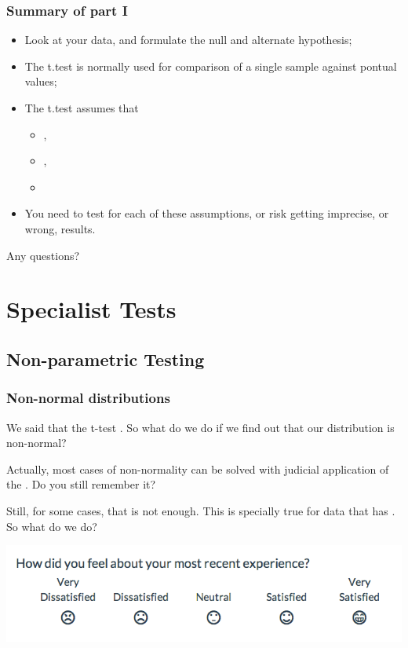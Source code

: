 \documentclass[10pt]{beamer}
\begin{document}
\begin{frame}
  \frametitle{Summary of part I}
  \begin{itemize}
  \item Look at your data, and formulate the null and alternate hypothesis;


  \item The t.test is normally used for comparison of a single sample
    against pontual values;


  \item The t.test assumes that 
    \begin{itemize}
    \item {},
    \item {},
    \item {}
    \end{itemize}

  \item You need to test for each of these assumptions, or risk
    getting imprecise, or wrong, results.
  \end{itemize}

  \bigskip

  Any questions?

\end{frame}

\section{Specialist Tests}
\subsection{Non-parametric Testing}

\begin{frame}
  \frametitle{Non-normal distributions}

  We said that the t-test . So what do we do if we find out that our distribution is
  non-normal?

  \bigskip

  Actually, most cases of non-normality can be solved with judicial
  application of the . Do you still
  remember it?

  \bigskip
  
  Still, for some cases, that is not enough. This is specially true
  for data that has . So what do we do?
  
  \bigskip

  \begin{center}
    \includegraphics[width=.8\textwidth]{img/likert_scale}
  \end{center}
\end{frame}
\end{document}
